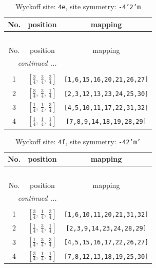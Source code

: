 \documentclass[fleqn,8pt]{jsarticle}
\begin{document}
\renewcommand{\arraystretch}{1.2}
\begin{longtable}{ccc}
\caption{Wyckoff site: {\tt 4e}, site symmetry: {\tt -4'2'm}}
 \\
 \hline \hline
No. & position & mapping \\ \hline \endfirsthead

\multicolumn{2}{l}{\tablename\ \thetable{}} \\
 \hline \hline
No. & position & mapping \\ \hline \endhead

 \hline \hline
\multicolumn{2}{r}{\footnotesize\it continued ...} \\ \endfoot

 \hline \hline
\multicolumn{2}{r}{} \\ \endlastfoot

1 & $\left[ \frac{3}{4},\, \frac{3}{4},\, \frac{3}{4} \right]$ & {\tt [1,6,15,16,20,21,26,27]} \\ \hline
2 & $\left[ \frac{3}{4},\, \frac{3}{4},\, \frac{1}{4} \right]$ & {\tt [2,3,12,13,23,24,25,30]} \\ \hline
3 & $\left[ \frac{1}{4},\, \frac{1}{4},\, \frac{3}{4} \right]$ & {\tt [4,5,10,11,17,22,31,32]} \\ \hline
4 & $\left[ \frac{1}{4},\, \frac{1}{4},\, \frac{1}{4} \right]$ & {\tt [7,8,9,14,18,19,28,29]} \\
\end{longtable}
\renewcommand{\arraystretch}{1.2}
\begin{longtable}{ccc}
\caption{Wyckoff site: {\tt 4f}, site symmetry: {\tt -42'm'}}
 \\
 \hline \hline
No. & position & mapping \\ \hline \endfirsthead

\multicolumn{2}{l}{\tablename\ \thetable{}} \\
 \hline \hline
No. & position & mapping \\ \hline \endhead

 \hline \hline
\multicolumn{2}{r}{\footnotesize\it continued ...} \\ \endfoot

 \hline \hline
\multicolumn{2}{r}{} \\ \endlastfoot

1 & $\left[ \frac{3}{4},\, \frac{1}{4},\, \frac{3}{4} \right]$ & {\tt [1,6,10,11,20,21,31,32]} \\ \hline
2 & $\left[ \frac{1}{4},\, \frac{3}{4},\, \frac{1}{4} \right]$ & {\tt [2,3,9,14,23,24,28,29]} \\ \hline
3 & $\left[ \frac{1}{4},\, \frac{3}{4},\, \frac{3}{4} \right]$ & {\tt [4,5,15,16,17,22,26,27]} \\ \hline
4 & $\left[ \frac{3}{4},\, \frac{1}{4},\, \frac{1}{4} \right]$ & {\tt [7,8,12,13,18,19,25,30]} \\
\end{longtable}
\end{document}
